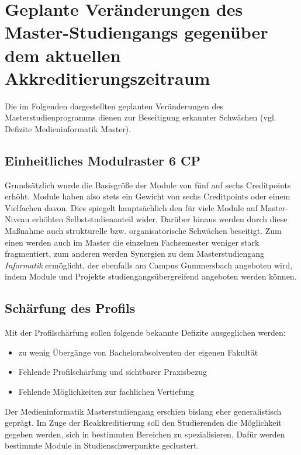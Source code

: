 \section{Geplante Veränderungen des Master-Studiengangs gegenüber dem
aktuellen
Akkreditierungszeitraum}\label{geplante-veruxe4nderungen-des-master-studiengangs-gegenuxfcber-dem-aktuellen-akkreditierungszeitraum}

Die im Folgenden dargestellten geplanten Veränderungen des
Masterstudienprogramms dienen zur Beseitigung erkannter Schwächen (vgl.
Defizite Medieninformatik Master).

\subsection{Einheitliches Modulraster 6
CP}\label{einheitliches-modulraster-6-cp}

Grundsätzlich wurde die Basisgröße der Module von fünf auf sechs
Creditpoints erhöht. Module haben also stets ein Gewicht von sechs
Creditpoints oder einem Vielfachen davon. Dies spiegelt hauptsächlich
den für viele Module auf Master-Niveau erhöhten Selbststudienanteil
wider. Darüber hinaus werden durch diese Maßnahme auch strukturelle bzw.
organisatorische Schwächen beseitigt. Zum einen werden auch im Master
die einzelnen Fachsemester weniger stark fragmentiert, zum anderen
werden Synergien zu dem Masterstudiengang \emph{Informatik} ermöglicht,
der ebenfalls am Campus Gummersbach angeboten wird, indem Module und
Projekte studiengangsübergreifend angeboten werden können.

\subsection{Schärfung des Profils}\label{schuxe4rfung-des-profils}

Mit der Profilschärfung sollen folgende bekannte Defizite ausgeglichen
werden:

\begin{itemize}
\tightlist
\item
  zu wenig Übergänge von Bachelorabsolventen der eigenen Fakultät
\item
  Fehlende Profilschärfung und sichtbarer Praxisbezug
\item
  Fehlende Möglichkeiten zur fachlichen Vertiefung
\end{itemize}

Der Medieninformatik Masterstudiengang erschien bislang eher
generalistisch geprägt. Im Zuge der Reakkreditierung soll den
Studierenden die Möglichkeit gegeben werden, sich in bestimmten
Bereichen zu spezialisieren. Dafür werden bestimmte Module in
Studienschwerpunkte geclustert.

